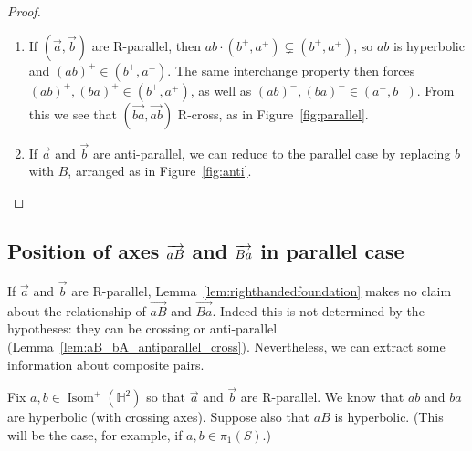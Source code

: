 \documentclass[11pt]{amsart}
\newcommand{\ora}[1]{\overrightarrow{#1}}
\numberwithin{equation}{section}
\numberwithin{figure}{section}
\theoremstyle{definition}
\theoremstyle{plain}
\newcommand\bbH{\ensuremath{\mathbb{H}}}
\DeclareMathOperator{\Isom}{Isom}
\begin{document}
\begin{proof}
\begin{enumerate}[label=(\Roman*)]
    Since $(\ora{B},\ora{a})$ also R-cross, the
    other conclusion follows.
  \item If $(\ora{a},\ora{b})$ are R-parallel, then $ab \cdot (b^+,a^+) \subsetneq (b^+,a^+)$, so $ab$ is
    hyperbolic and $(ab)^+ \in (b^+,a^+)$. The same interchange
    property then forces
    $(ab)^+, (ba)^+ \in (b^+,a^+)$, as well as
    $(ab)^-, (ba)^- \in (a^-,b^-)$. From this we see that
    $(\ora{ba},\ora{ab})$ R-cross, as in Figure~\ref{fig:parallel}.
  \item If $\ora{a}$ and $\ora{b}$ are anti-parallel, we can reduce to
    the parallel case by replacing $b$ with $B$, arranged as in
    Figure~\ref{fig:anti}.\qedhere
  \end{enumerate}
\end{proof}

\subsection{Position of axes 
\texorpdfstring{$\protect\ora{aB}$}{aB} and \texorpdfstring{$\protect\ora{Ba}$}{Ba} in parallel  case}
\label{subsec:antiparallel}
If $\ora{a}$ and $\ora{b}$ are R-parallel,
Lemma~\ref{lem:righthandedfoundation} makes no claim about the
relationship of $\ora{aB}$ and $\ora{Ba}$. Indeed this is not
determined by the hypotheses: they can be crossing or anti-parallel
(Lemma~\ref{lem:aB_bA_antiparallel_cross}).
Nevertheless, we can extract some information about composite pairs.

Fix $a,b \in \Isom^+(\bbH^2)$ so that $\ora{a}$ and $\ora{b}$ are
R-parallel. We know that $ab$ and $ba$ are
hyperbolic (with crossing axes). Suppose also that $aB$ is hyperbolic. (This will be the case, for example, if $a,b \in \pi_1(S)$.)
\end{document}
